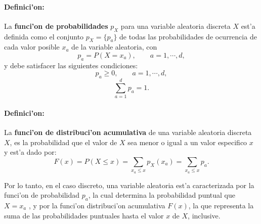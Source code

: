 \documentclass[a4paper]{report}
\begin{document}


\paragraph{Definici'on:} La \textbf{funci'on de probabilidades} $p_X$ para una variable aleatoria discreta $X$ est'a definida como el conjunto $p_X=\{p_a\}$ de todas las probabilidades de ocurrencia de cada valor posible $x_a$ de la variable aleatoria, con
\begin{equation}
p_a=P(X=x_a) , \qquad   a=1,\cdots, d,
\end{equation}
y debe satisfacer las siguientes condiciones:
\begin{equation}
p_a\geq 0, \qquad  a=1,\cdots, d,
\end{equation}
\begin{equation}
\sum_{a=1}^d p_a=1.
\end{equation}
		 
\paragraph{Definici'on:} La \textbf{funci'on de distribuci'on acumulativa} de una variable aleatoria discreta $X$, es la probabilidad que el valor de $X$ sea menor o igual a un valor especifico $x$ y est'a dado por:
\begin{equation}
F(x)=P(X\le x)=\sum_{x_a\le x}p_X(x_a)=\sum_{x_a\le x}p_a.
\end{equation}
		
	Por lo tanto, en el caso discreto, una variable aleatoria est'a caracterizada por la funci'on de probabilidad $p_a$, la cual determina la probabilidad puntual que $X = x_a$ , y por la funci'on distribuci'on acumulativa $F(x)$, la que representa la suma de las probabilidades puntuales hasta el valor $x$ de $X$, inclusive.
		 
 
\end{document}
